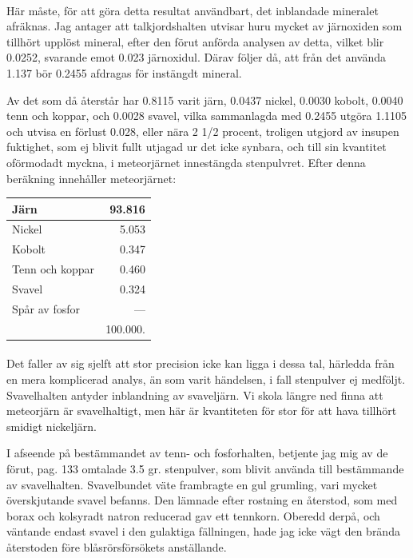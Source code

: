 \documentclass[a4paper, 12pt, oneside, swedish]{article}
\begin{document}
\paragraph{}
Här måste, för att göra detta resultat användbart, det inblandade mineralet afräknas. Jag antager att talkjordshalten utvisar huru mycket av järnoxiden som tillhört upplöst mineral, efter den förut anförda analysen av detta, vilket blir 0.0252, svarande emot 0.023 järnoxidul. Därav följer då, att från det använda 1.137 bör 0.2455 afdragas för instängdt mineral.

Av det som då återstår har 0.8115 varit järn, 0.0437 nickel, 0.0030 kobolt, 0.0040 tenn och koppar, och 0.0028 svavel, vilka sammanlagda med 0.2455 utgöra 1.1105 och utvisa en förlust 0.028, eller nära 2 1/2 procent, troligen utgjord av insupen fuktighet, som ej blivit fullt utjagad ur det icke synbara, och till sin kvantitet oförmodadt myckna, i meteorjärnet innestängda stenpulvret. Efter denna beräkning innehåller meteorjärnet:
\begin{table}[H]
    \centering\small
    \begin{tabular}{|l|r|}
    \hline
        Järn & 93.816 \\ \hline
        Nickel & 5.053 \\ \hline
        Kobolt & 0.347 \\ \hline
        Tenn och koppar & 0.460 \\ \hline
        Svavel & 0.324 \\ \hline
        Spår av fosfor & --- \\ \hline
        ~ & 100.000. \\ \hline
    \end{tabular}
\end{table}
\paragraph{}
Det faller av sig sjelft att stor precision icke kan ligga i dessa tal, härledda från en mera komplicerad analys, än som varit händelsen, i fall stenpulver ej medföljt. Svavelhalten antyder inblandning av svaveljärn. Vi skola längre ned finna att meteorjärn är svavelhaltigt, men här är kvantiteten för stor för att hava tillhört smidigt nickeljärn.

I afseende på bestämmandet av tenn- och fosforhalten, betjente jag mig av de förut, pag. 133 omtalade 3.5 gr. stenpulver, som blivit använda till bestämmande av svavelhalten. Svavelbundet väte frambragte en gul grumling, vari mycket överskjutande svavel befanns. Den lämnade efter rostning en återstod, som med borax och kolsyradt natron reducerad gav ett tennkorn. Oberedd derpå, och väntande endast svavel i den gulaktiga fällningen, hade jag icke vägt den brända återstoden före blåsrörsförsökets anställande.
\end{document}
